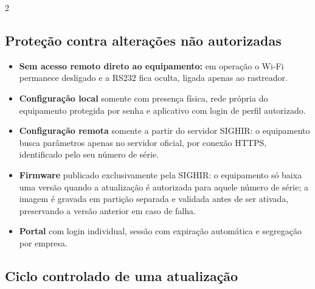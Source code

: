 \documentclass[a4paper,10pt]{article}
\begin{document}
\begin{multicols}{2}
\columnbreak
\subsection{Proteção contra alterações não autorizadas}
\begin{itemize}
  \item \textbf{Sem acesso remoto direto ao equipamento:} em operação o Wi-Fi permanece desligado e a RS232 fica oculta, ligada apenas ao rastreador.
  \item \textbf{Configuração local} somente com presença física, rede própria do equipamento protegida por senha e aplicativo com login de perfil autorizado.
  \item \textbf{Configuração remota} somente a partir do servidor SIGHIR: o equipamento busca parâmetros apenas no servidor oficial, por conexão HTTPS, identificado pelo seu número de série.
  \item \textbf{Firmware} publicado exclusivamente pela SIGHIR: o equipamento só baixa uma versão quando a atualização é autorizada para aquele número de série; a imagem é gravada em partição separada e validada antes de ser ativada, preservando a versão anterior em caso de falha.
  \item \textbf{Portal} com login individual, sessão com expiração automática e segregação por empresa.
\end{itemize}

\subsection{Ciclo controlado de uma atualização}
\begin{center}
\end{center}


\end{multicols}
\end{document}
